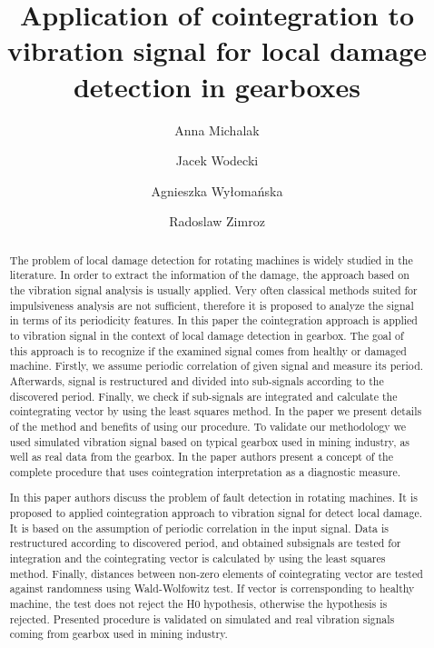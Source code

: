 \documentclass[preprint]{elsarticle}
\begin{document}
\begin{frontmatter}

\title{Application of cointegration to vibration signal for local damage detection in gearboxes}


\author[label1]{Anna Michalak}
\author[label2]{Jacek Wodecki}
\author[label1]{Agnieszka Wy{\l}oma{\'n}ska}
\author[label2]{Radoslaw Zimroz}


\address[label1]{Research and Development Centre, KGHM Cuprum Ltd, Sikorskiego 2-8, 53-659 Wroclaw, Poland
\\ \{amichalak, awylomanska\}@cuprum.wroc.pl\\}

\address[label2]{Diagnostics and Vibro-Acoustic Science Laboratory, Wroclaw University of Science and Technology, Na Grobli 15, 50-421 Wroclaw
\\\{jacek.wodecki, radoslaw.zimroz\}@pwr.edu.pl\\}

\begin{abstract}
The problem of local damage detection for rotating machines is widely studied in the literature. In order to extract the information of the damage, the approach based on the vibration signal analysis is usually applied. Very often classical methods suited for impulsiveness analysis are not sufficient, therefore it is proposed to analyze the signal in terms of its periodicity features. In this paper the cointegration approach is  applied to vibration signal in the context of local damage detection in gearbox. The goal of this approach is to recognize if the examined signal comes from healthy or damaged machine. Firstly, we assume periodic correlation of given signal and measure its period. Afterwards, signal is restructured and divided into sub-signals according to the discovered period. Finally, we check if sub-signals are integrated and calculate the cointegrating vector by using the least squares method. In the paper we present details of the method and benefits of using our procedure. To validate our methodology we used simulated vibration signal based on typical gearbox used in mining industry, as well as real data from the gearbox. In the paper authors present a concept of the complete procedure that uses cointegration interpretation as a diagnostic measure.
\par

In this paper authors discuss the problem of fault detection in rotating machines. It is proposed to applied cointegration approach to vibration signal for detect local damage. It is based on the assumption of periodic correlation in the input signal. Data is restructured according to discovered period, and obtained subsignals are tested for integration and the cointegrating vector is calculated by using the least squares method. Finally, distances between non-zero elements of cointegrating vector are tested against randomness using Wald-Wolfowitz test. If vector is corrensponding to healthy machine, the test does not reject the H0 hypothesis, otherwise the hypothesis is rejected.  Presented procedure is validated on simulated and real vibration signals coming from gearbox used in mining industry.
\end{abstract}


\end{frontmatter}
\end{document}
